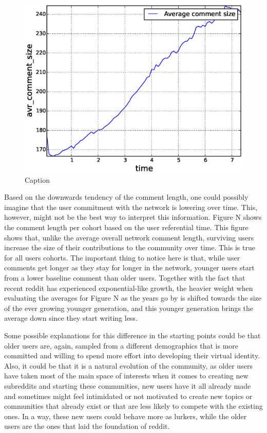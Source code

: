 \begin{figure}[!tb]
\centering
\includegraphics[scale=0.4]{./images/avr_comment_size_user_ref_total.eps}
\caption{Caption}
\label{fig:avr_comment_size_user_ref_total}
\end{figure}

Based on the downwards tendency of the comment length, one could possibly imagine that the user commitment with the network is lowering over time. This, however, might not be the best way to interpret this information. Figure N shows the comment length per cohort based on the user referential time. This figure shows that, unlike the average overall network comment length, surviving users increase the size of their contributions to the community over time. This is true for all users cohorts. The important thing to notice here is that, while user comments get longer as they stay for longer in the network, younger users start from a lower baseline comment than older users. Together with the fact that recent reddit has experienced exponential-like growth, the heavier weight when evaluating the averages for Figure N as the years go by is shifted towards the size of the ever growing younger generation, and this younger generation brings the average down since they start writing less.

Some possible explanations for this difference in the starting points could be that older users are, again, sampled from a different demographics that is more committed and willing to spend more effort into developing their virtual identity. Also, it could be that it is a natural evolution of the community, as older users have taken most of the main space of interests when it comes to creating new subreddits and starting these communities, new users have it all already made and sometimes might feel intimidated or not motivated to create new topics or communities that already exist or that are less likely to compete with the existing ones. In a way, these new users could behave more as lurkers, while the older users are the ones that laid the foundation of reddit.

